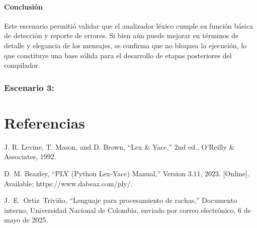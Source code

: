 \documentclass{article}
\begin{document}
\paragraph{Conclusión}

Este escenario permitió validar que el analizador léxico cumple su función básica de detección y reporte de errores. Si bien aún puede mejorar en términos de detalle y elegancia de los mensajes, se confirma que no bloquea la ejecución, lo que constituye una base sólida para el desarrollo de etapas posteriores del compilador.


\subsubsection{Escenario 3: }



\section{Referencias}
\renewcommand{\refname}{}

\begin{thebibliography}{9}


 \label{ref:lexPy1} J. R. Levine, T. Mason, and D. 
Brown, “Lex \& Yacc,” 2nd ed., O’Reilly \& Associates, 1992.

 \label{ref:lexPy2}  D. M. Beazley, “PLY (Python Lex‐Yacc)
Manual,” Version 3.11, 2023. [Online]. Available: https://www.dabeaz.com/ply/.

 \label{ref:rachas} J.~E.~Ortiz~Triviño, ``Lenguaje para 
  procesamiento de rachas,'' Documento interno, Universidad Nacional de 
    Colombia, enviado por correo electrónico, 6 de mayo de 2025.

\end{thebibliography}
\end{document}

